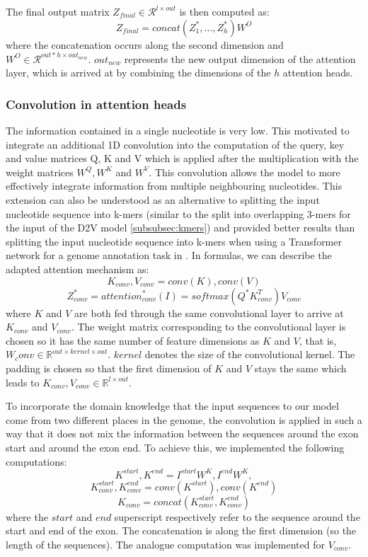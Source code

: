 The final output matrix $Z_{final} \in \mathcal{R}^{l \times out}$ is then computed as:
$$Z_{final} = concat(Z_1^*, \dots, Z_{h}^*) W^O$$
where the concatenation occurs along the second dimension and $W^O \in \mathcal{R}^{out * h \times out_{new}}$. $out_{new}$ represents the new output dimension of the attention layer, which is arrived at by combining the dimensions of the $h$ attention heads.

\subsubsection{Convolution in attention heads} \label{subsubsec:attention_conv}
The information contained in a single nucleotide is very low. 
This motivated \cite{ghentransformers} to integrate an additional 1D convolution into the computation of the query, key and value matrices Q, K and V which is applied after the multiplication with the weight matrices $W^Q, W^K$ and $W^V$. This convolution allows the model to more effectively integrate information from multiple neighbouring nucleotides. This extension can also be understood as an alternative to splitting the input nucleotide sequence into k-mers (similar to the split into overlapping 3-mers for the input of the D2V model \ref{subsubsec:kmers}) and provided better results than splitting the input nucleotide sequence into k-mers when using a Transformer network for a genome annotation task in \cite{ghentransformers}.
In formulas, we can describe the adapted attention mechanism as:
$$K_{conv}, V_{conv} = conv(K), conv(V)$$
$$Z^*_{conv} = {attention}_{conv}^*(I) = softmax({Q}^*K_{conv}^T)V_{conv}$$
where $K$ and $V$ are both fed through the same convolutional layer to arrive at $K_{conv}$ and $V_{conv}$. The weight matrix corresponding to the convolutional layer is chosen so it has the same number of feature dimensions as $K$ and $V$, that is, $W_conv \in \mathbb{R}^{out \times kernel \times out}$. $kernel$ denotes the size of the convolutional kernel. 
The padding is chosen so that the first dimension of $K$ and $V$ stays the same which leads to $K_{conv}, V_{conv} \in \mathbb{R}^{l \times out}$.

To incorporate the domain knowledge that the input sequences to our model come from two different places in the genome, the convolution is applied in such a way that it does not mix the information between the sequences around the exon start and around the exon end. To achieve this, we implemented the following computations:
$$K^{start}, K^{end} = I^{start}W^K, I^{end}W^K,$$
$$K^{start}_{conv}, K^{end}_{conv} = conv(K^{start}), conv(K^{end})$$
$$K_{conv} = concat(K^{start}_{conv}, K^{end}_{conv})$$
where the $start$ and $end$ superscript respectively refer to the sequence around the start and end of the exon. The concatenation is along the first dimension (so the length of the sequences). The analogue computation was implemented for $V_{conv}$.


